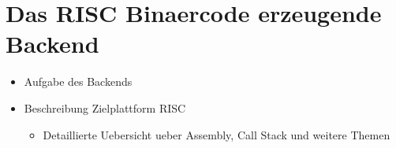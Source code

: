 \chapter{Das RISC Binaercode erzeugende Backend}
\label{chapter}

\begin{itemize}
  \item Aufgabe des Backends
  \item Beschreibung Zielplattform RISC
  \begin{itemize}
    \item Detaillierte Uebersicht ueber Assembly, Call Stack und weitere Themen
  \end{itemize}
\end{itemize}
